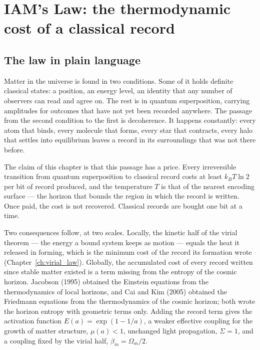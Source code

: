 \providecommand{\authorhold}[1]{\par\smallskip\noindent\fbox{\parbox{0.95\linewidth}{\small\textbf{Author hold.} #1}}\par\smallskip}

\chapter{IAM's Law: the thermodynamic cost of a classical record}\label{ch:iams_law}

\section{The law in plain language}
Matter in the universe is found in two conditions. Some of it holds definite classical states: a position, an energy level, an identity that any number
of observers can read and agree on. The rest is in quantum superposition, carrying amplitudes for outcomes that have not yet been recorded anywhere.
The passage from the second condition to the first is decoherence. It happens constantly: every atom that binds, every molecule that forms, every star
that contracts, every halo that settles into equilibrium leaves a record in its surroundings that was not there before.

The claim of this chapter is that this passage has a price. Every irreversible transition from quantum superposition to classical record costs at least
$k_BT\ln2$ per bit of record produced, and the temperature $T$ is that of the nearest encoding surface --- the horizon that bounds the region in which the
record is written. Once paid, the cost is not recovered. Classical records are bought one bit at a time.

Two consequences follow, at two scales. Locally, the kinetic half of the virial theorem --- the energy a bound system keeps as motion --- equals the heat it
released in forming, which is the minimum cost of the record its formation wrote (Chapter~\ref{ch:virial_law}). Globally, the accumulated cost of every
record written since stable matter existed is a term missing from the entropy of the cosmic horizon. Jacobson (1995) obtained the Einstein equations from
the thermodynamics of local horizons, and Cai and Kim (2005) obtained the Friedmann equations from the thermodynamics of the cosmic horizon; both wrote
the horizon entropy with geometric terms only. Adding the record term gives the activation function $E(a)=\exp(1-1/a)$, a weaker effective coupling for
the growth of matter structure, $\mu(a)<1$, unchanged light propagation, $\Sigma=1$, and a coupling fixed by the virial half, $\beta_m=\Omega_m/2$.

